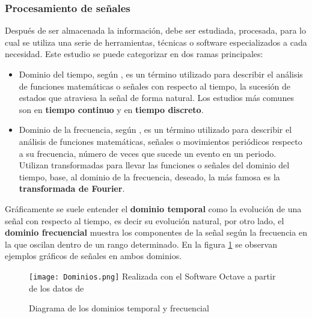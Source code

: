\subsubsection{Procesamiento de señales}

Después de ser almacenada la información, debe ser estudiada, procesada, para lo
cual se utiliza una serie de herramientas, técnicas o software especializados
a cada necesidad. Este estudio se puede categorizar en dos ramas principales:

\begin{itemize}
    \item Dominio del tiempo, según \textcite{wiki:DominioTiempo}, es un término
        utilizado para describir el análisis
        de funciones matemáticas o señales con respecto al tiempo, la sucesión
        de estados que atraviesa la señal de forma natural. Los estudios más
        comunes son en  \textbf{tiempo continuo} y en \textbf{tiempo discreto}.

    \item Dominio de la frecuencia, según \textcite{wiki:DominioFrecuencia}, es un
        término utilizado para describir el análisis
        de funciones matemáticas, señales o movimientos periódicos respecto a
        su frecuencia, número de veces que sucede un evento en un periodo.
        Utilizan transformadas para llevar las funciones o señales del dominio
        del tiempo, base, al dominio de la frecuencia, deseado, la más famosa es
        la \textbf{transformada de Fourier}.
\end{itemize}


Gráficamente se suele entender el \textbf{dominio temporal} como la evolución
de una señal con respecto al tiempo, es decir su evolución natural, por otro
lado, el \textbf{dominio frecuencial} muestra los componentes de la señal según
la frecuencia en la que oscilan dentro de un rango determinado.
En la figura \ref{Dominios} se observan ejemplos gráficos de señales en ambos
dominios.

	\begin{figure}[htb]
		\centering
        \caption{ Diagrama de los dominios temporal y frecuencial}
        \texttt{[image: Dominios.png]}
        Realizada con el Software Octave a partir de los datos de
                \textcite{HUANG20181745}
        \label{Dominios}

	\end{figure}


